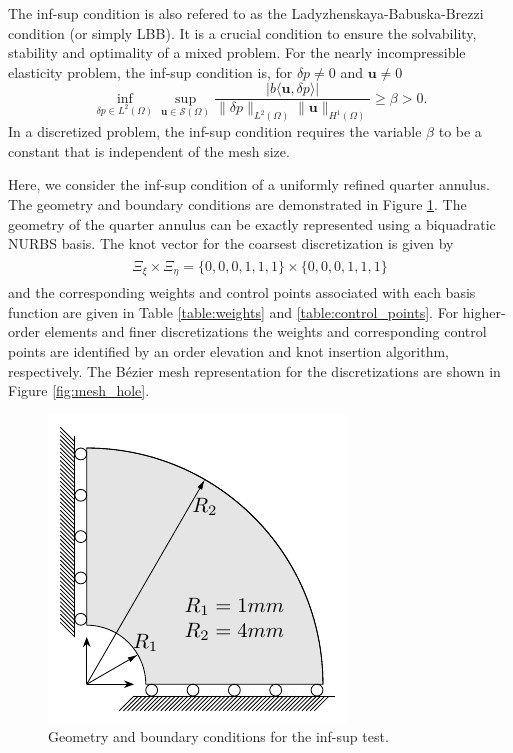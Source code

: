 \documentclass{article}
\begin{document}
\subsubsection{}

The inf-sup condition is also refered to as the Ladyzhenskaya-Babuska-Brezzi condition (or simply LBB). It is a crucial condition to ensure the solvability, stability and optimality of a mixed problem. For the nearly incompressible elasticity problem, the inf-sup condition is, for $\delta{p}\neq{0}$ and $\mathbf{u}\neq{0}$
\begin{equation}
    \inf_{\delta{p}\in{L^2(\Omega)}}\sup_{\mathbf{u}\in\mathcal{S}(\Omega)}\dfrac{\vert{b\langle{\mathbf{u},\delta{p}}\rangle}\vert}{\|{\delta{p}}\|_{L^2(\Omega)}\|{\mathbf{u}}\|_{H^1(\Omega)}}\geq\beta>0.
\end{equation}
In a discretized problem, the inf-sup condition requires the variable $\beta$ to be a constant that is independent of the mesh size.\par

Here, we consider the inf-sup condition of a uniformly refined quarter annulus. The geometry and boundary conditions are demonstrated in Figure \ref{fig:quarter_annulus}. The geometry of the quarter annulus can be exactly represented using a biquadratic NURBS basis. The knot vector for the coarsest discretization is given by
\begin{align}
\begin{split}
\Xi_\xi\times\Xi_\eta=\lbrace{0,0,0,1,1,1}\rbrace\times\lbrace{0,0,0,1,1,1}\rbrace
\end{split}
\end{align}
and the corresponding weights and control points associated with each basis function are given in Table \ref{table:weights} and \ref{table:control_points}. For higher-order elements and finer discretizations the weights and corresponding control points are identified by an order elevation and knot insertion algorithm, respectively. The B\'ezier mesh representation for the discretizations are shown in Figure \ref{fig:mesh_hole}.

\begin{figure}[htb!]
	\centering
	\includegraphics[width=0.5\linewidth]{annular}
	\caption{Geometry and boundary conditions for the inf-sup test.}
	\label{fig:quarter_annulus}
\end{figure}
\end{document}
